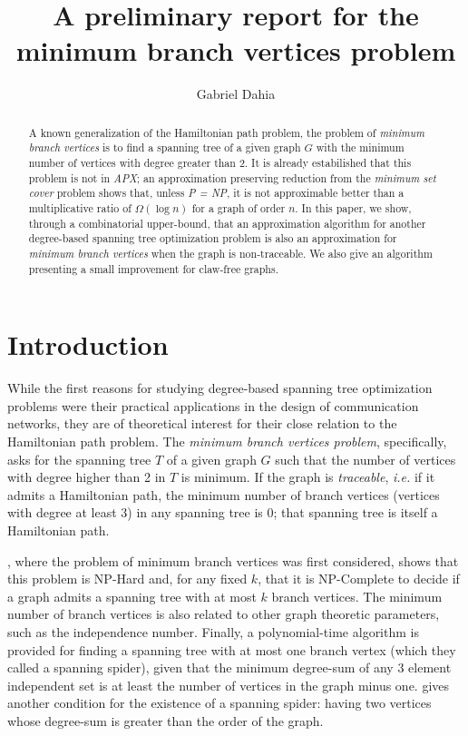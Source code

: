 \documentclass[12pt]{article}
\title{A preliminary report for the minimum branch vertices problem}
\author{Gabriel Dahia\inst{1}}
\begin{document}
 

\maketitle

\begin{abstract}
  A known generalization of the Hamiltonian path problem, the problem of \emph{minimum branch vertices} is to find a spanning tree of a given graph $G$ with the minimum number of vertices with degree greater than 2.
  It is already estabilished that this problem is not in \emph{APX}; an approximation preserving reduction from the \emph{minimum set cover} problem shows that, unless \emph{P = NP}, it is not approximable better than a multiplicative ratio of $\Omega(\log n )$ for a graph of order $n$.
  In this paper, we show, through a combinatorial upper-bound, that an approximation algorithm for another degree-based spanning tree optimization problem is also an approximation for \emph{minimum branch vertices} when the graph is non-traceable.
  We also give an algorithm presenting a small improvement for claw-free graphs.
\end{abstract}
     
\section{Introduction}

While the first reasons for studying degree-based spanning tree optimization problems were their practical applications in the design of communication networks, they are of theoretical interest for their close relation to the Hamiltonian path problem.
The \emph{minimum branch vertices problem}, specifically, asks for the spanning tree $T$ of a given graph $G$ such that the number of vertices with degree higher than 2 in $T$ is minimum.
If the graph is \emph{traceable}, \emph{i.e.} if it admits a Hamiltonian path, the minimum number of branch vertices (vertices with degree at least 3) in any spanning tree is 0; that spanning tree is itself a Hamiltonian path.

\cite{gargano2004}, where the problem of minimum branch vertices was first considered, shows that this problem is NP-Hard and, for any fixed $k$, that it is NP-Complete to decide if a graph admits a spanning tree with at most $k$ branch vertices. 
The minimum number of branch vertices is also related to other graph theoretic parameters, such as the independence number.
Finally, a polynomial-time algorithm is provided for finding a spanning tree with at most one branch vertex (which they called a spanning spider), given that the minimum degree-sum of any 3 element independent set is at least the number of vertices in the graph minus one.
\cite{flandrin2008} gives another condition for the existence of a spanning spider: having two vertices whose degree-sum is greater than the order of the graph. 
\end{document}
